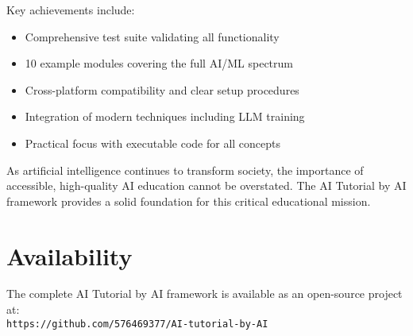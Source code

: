 \documentclass[11pt,twocolumn]{article}
\begin{document}
Key achievements include:
\begin{itemize}
    \item Comprehensive test suite validating all functionality
    \item 10 example modules covering the full AI/ML spectrum
    \item Cross-platform compatibility and clear setup procedures
    \item Integration of modern techniques including LLM training
    \item Practical focus with executable code for all concepts
\end{itemize}

As artificial intelligence continues to transform society, the importance of accessible, high-quality AI education cannot be overstated. The AI Tutorial by AI framework provides a solid foundation for this critical educational mission.

\section*{Availability}

The complete AI Tutorial by AI framework is available as an open-source project at: \\
\texttt{https://github.com/576469377/AI-tutorial-by-AI}
\end{document}
